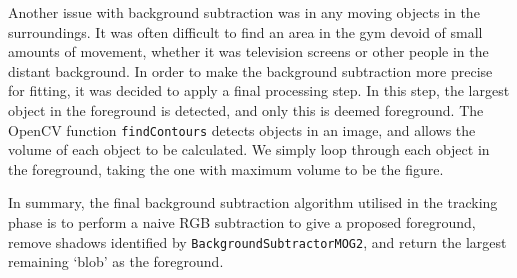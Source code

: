 Another issue with background subtraction was in any moving objects in the surroundings. It was often difficult to find an area in the gym devoid of small amounts of movement, whether it was television screens or other people in the distant background. In order to make the background subtraction more precise for fitting, it was decided to apply a final processing step. In this step, the largest object in the foreground is detected, and only this is deemed foreground. The OpenCV function \texttt{findContours} detects objects in an image, and allows the volume of each object to be calculated. We simply loop through each object in the foreground, taking the one with maximum volume to be the figure.

In summary, the final background subtraction algorithm utilised in the tracking phase is to perform a naive RGB subtraction to give a proposed foreground, remove shadows identified by \texttt{BackgroundSubtractorMOG2}, and return the largest remaining `blob' as the foreground.